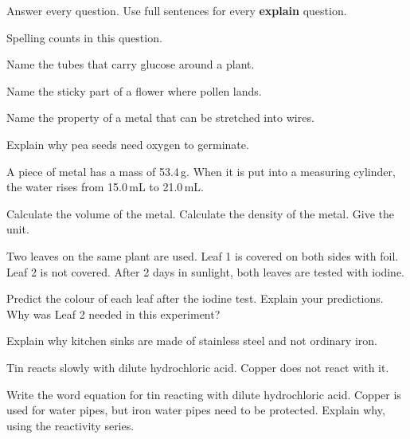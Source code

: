 \documentclass[11pt]{article}
\begin{document}
Answer every question. Use full sentences for every \textbf{explain} question.

\Q Spelling counts in this question.
\par{} Name the tubes that carry glucose around a plant. \hfill{}
\par{} Name the sticky part of a flower where pollen lands. \hfill{}
\par{} Name the property of a metal that can be stretched into wires. \hfill{}\par\vspace{1mm}

\Q Explain why pea seeds need oxygen to germinate.

\Q A piece of metal has a mass of 53.4\,g. When it is put into a measuring cylinder, the water rises from 15.0\,mL to 21.0\,mL.
\par{} Calculate the volume of the metal.
 Calculate the density of the metal. Give the unit.

\Q Two leaves on the same plant are used. Leaf 1 is covered on both sides with foil. Leaf 2 is not covered. After 2 days in sunlight, both leaves are tested with iodine.
\par{} Predict the colour of each leaf after the iodine test.
 Explain your predictions.
 Why was Leaf 2 needed in this experiment?

\Q Explain why kitchen sinks are made of stainless steel and not ordinary iron.

\Q Tin reacts slowly with dilute hydrochloric acid. Copper does not react with it.
\par{} Write the word equation for tin reacting with dilute hydrochloric acid.
 Copper is used for water pipes, but iron water pipes need to be protected. Explain why, using the reactivity series.
\end{document}

